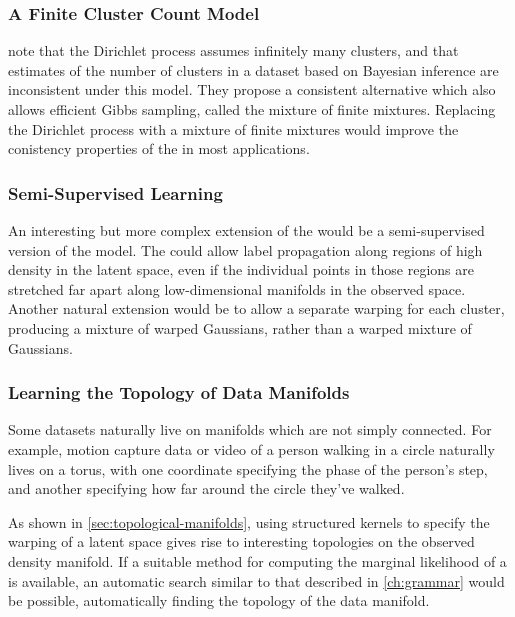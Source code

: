\subsubsection{A Finite Cluster Count Model}
\citet{miller2013inconsistent} note that the Dirichlet process assumes infinitely many clusters, and that estimates of the number of clusters in a dataset based on Bayesian inference are inconsistent under this model.
They propose a consistent alternative which also allows efficient Gibbs sampling, called the mixture of finite mixtures.
Replacing the Dirichlet process with a mixture of finite mixtures would improve the conistency properties of the \iwmm{} in most applications.




\subsubsection{Semi-Supervised Learning}

An interesting but more complex extension of the \iwmm{} would be a semi-supervised version of the model.
The \iwmm{} could allow label propagation along regions of high density in the latent space, even if the individual points in those regions are stretched far apart along low-dimensional manifolds in the observed space.
Another natural extension would be to allow a separate warping for each cluster, producing a mixture of warped Gaussians, rather than a warped mixture of Gaussians.%




\subsubsection{Learning the Topology of Data Manifolds}

Some datasets naturally live on manifolds which are not simply connected.
For example, motion capture data or video of a person walking in a circle naturally lives on a torus, with one coordinate specifying the phase of the person's step, and another specifying how far around the circle they've walked.

As shown in \cref{sec:topological-manifolds}, using structured kernels to specify the warping of a latent space gives rise to interesting topologies on the observed density manifold.
If a suitable method for computing the marginal likelihood of a \gplvm{} is available, an automatic search similar to that described in \cref{ch:grammar} would be possible, automatically finding the topology of the data manifold.


